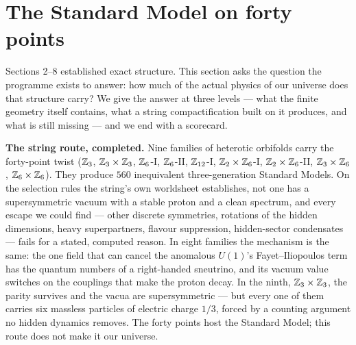 \section{The Standard Model on forty points}
\label{sec:physics}

Sections 2--8 established exact structure. This section asks the question the programme
exists to answer: how much of the actual physics of our universe does that structure
carry? We give the answer at three levels --- what the finite geometry itself contains,
what a string compactification built on it produces, and what is still missing --- and we
end with a scorecard.

\begin{keyidea}
\textbf{The string route, completed.} Nine families of heterotic orbifolds carry the forty-point twist
($\mathbb{Z}_3$, $\mathbb{Z}_3\times\mathbb{Z}_3$, $\mathbb{Z}_6$-I, $\mathbb{Z}_6$-II, $\mathbb{Z}_{12}$-I, $\mathbb{Z}_2\times\mathbb{Z}_6$-I, $\mathbb{Z}_2\times\mathbb{Z}_6$-II, $\mathbb{Z}_3\times\mathbb{Z}_6$,
$\mathbb{Z}_6\times\mathbb{Z}_6$). They produce $560$ inequivalent three-generation Standard Models. On the selection rules the string's
own worldsheet establishes, not one has a supersymmetric vacuum with a stable proton and a clean spectrum, and
every escape we could find --- other discrete symmetries, rotations of the hidden dimensions, heavy
superpartners, flavour suppression, hidden-sector condensates --- fails for a stated, computed reason. In eight
families the mechanism is the same: the one field that can cancel the anomalous $U(1)$'s Fayet--Iliopoulos term has
the quantum numbers of a right-handed sneutrino, and its vacuum value switches on the couplings that make the
proton decay. In the ninth, $\mathbb{Z}_3\times\mathbb{Z}_3$, the parity survives and the vacua are supersymmetric --- but every one
of them carries six massless particles of electric charge $1/3$, forced by a counting argument no hidden dynamics
removes. The forty points host the Standard Model; this route does not make it our universe.
\end{keyidea}

